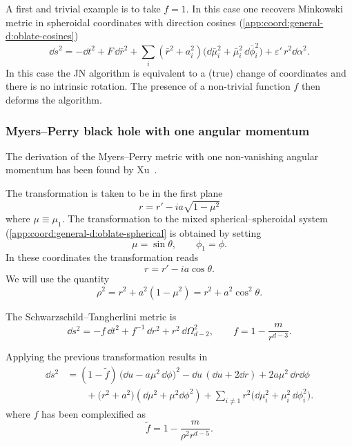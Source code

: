 A first and trivial example is to take $f = 1$.
In this case one recovers Minkowski metric in spheroidal coordinates with direction cosines (\cref{app:coord:general-d:oblate-cosines})
\begin{equation}
	\dd s^2 = - \dd t^2 + F\, \dd \bar r^2 + \sum_i (\bar r^2 + a_i^2) \Big(\dd \bar \mu_i^2 + \bar \mu_i^2\, \dd \bar \phi_i^2 \Big) + \varepsilon'\, r^2 \dd \alpha^2.
\end{equation}
In this case the JN algorithm is equivalent to a (true) change of coordinates and there is no intrinsic rotation.
The presence of a non-trivial function $f$ then deforms the algorithm.


\subsubsection{Myers--Perry black hole with one angular momentum}


The derivation of the Myers--Perry metric with one non-vanishing angular momentum has been found by Xu~\cite{Xu:1988:ExactSolutionsEinstein}.

The transformation is taken to be in the first plane
\begin{equation}
	r = r' - i a \sqrt{1 - \mu^2}
\end{equation} 
where $\mu \equiv \mu_1$.
The transformation to the mixed spherical--spheroidal system (\cref{app:coord:general-d:oblate-spherical} is obtained by setting
\begin{equation}
	\mu = \sin \theta, \qquad
	\phi_1 = \phi.
\end{equation} 
In these coordinates the transformation reads
\begin{equation}
	r = r' - i a \cos \theta.
\end{equation} 
We will use the quantity
\begin{equation}
	\rho^2 = r^2 + a^2 (1 - \mu^2)
		= r^2 + a^2 \cos^2 \theta.
\end{equation} 

The Schwarzschild--Tangherlini metric is~\cite{Tangherlini:1963:SchwarzschildFieldDimensions}
\begin{equation}
	\dd s^2 = - f\, \dd t^2 + f^{-1}\, \dd r^2 + r^2\, \dd \Omega_{d-2}^2, \qquad
	f = 1 - \frac{m}{r^{d-3}}.
\end{equation} 

Applying the previous transformation results in
\begin{equation}
\begin{aligned}
	\dd s^2 &= (1 - \tilde f)\, \Big(\dd u - a \mu^2\, \dd \phi \Big)^2
		- \dd u\, (\dd u + 2 \dd r)
		+ 2 a \mu^2\, \dd r \dd \phi \\
		&\qquad+ \big( r^2 + a^2 \big) (\dd\mu^2 + \mu^2 \dd\phi^2)
		+ \sum_{i \neq 1} r^2 \big( \dd \mu_i^2 + \mu_i^2\, \dd \phi_i^2 \big).
\end{aligned}
\end{equation}
where $f$ has been complexified as
\begin{equation}
	\tilde f = 1 - \frac{m}{\rho^2 r^{d-5}}.
\end{equation} 

